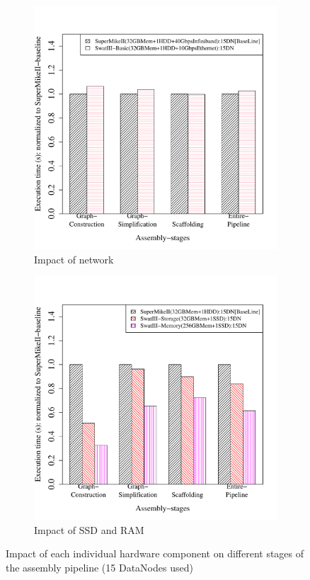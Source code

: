\documentclass[conference]{IEEEtran}
\begin{document}
\begin{figure}[htb]
	\begin{subfigure}[b]{0.5\textwidth}
                \includegraphics[width=\textwidth]{Figure/PerormanceData/Plots/Network.pdf}
                \caption{Impact of network}
                \label{fig:SuperMikeSwatBasic}
        \end{subfigure}
 	\begin{subfigure}[b]{0.5\textwidth}
                \includegraphics[width=\textwidth]{Figure/PerormanceData/Plots/StorageMemory.pdf}
                \caption{Impact of SSD and RAM}
                \label{fig:SuperMikeSwatStorageMemory}
   \end{subfigure}
   \caption{Impact of each individual hardware component on different stages of the assembly pipeline (15 DataNodes used)}
  \label{fig:SuperMikeSwat}
\end{figure}
\end{document}

